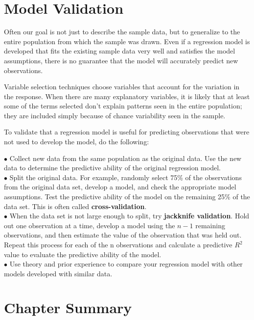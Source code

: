 \documentclass[
]{report}
\begin{document}
\section*{Model Validation}\label{model-validation}

Often our goal is not just to describe the sample data, but to generalize to the entire population from which the sample was drawn. Even if a regression model is developed that fits the existing sample data very well and satisfies the model assumptions, there is no guarantee that the model will accurately predict new observations.

Variable selection techniques choose variables that account for the variation in the response. When there are many explanatory variables, it is likely that at least some of the terms selected don't explain patterns seen in the entire population; they are included simply because of chance variability seen in the sample.

To validate that a regression model is useful for predicting observations that were not used to develop
the model, do the following:

\(\bullet\) Collect new data from the same population as the original data. Use the new data to determine the
predictive ability of the original regression model.\\
\(\bullet\) Split the original data. For example, randomly select 75\% of the observations from the original data
set, develop a model, and check the appropriate model assumptions. Test the predictive ability of the
model on the remaining 25\% of the data set. This is often called \textbf{cross-validation}.\\
\(\bullet\) When the data set is not large enough to split, try \textbf{jackknife validation}. Hold out one observation at
a time, develop a model using the \(n-1\) remaining observations, and then estimate the value of the observation that was held out. Repeat this process for each of the n observations and calculate a predictive \(R^2\) value to evaluate the predictive ability of the model.\\
\(\bullet\) Use theory and prior experience to compare your regression model with other models developed with
similar data.

\section*{\texorpdfstring{\textbf{Chapter Summary}}{Chapter Summary}}\label{chapter-summary-2}
\end{document}
